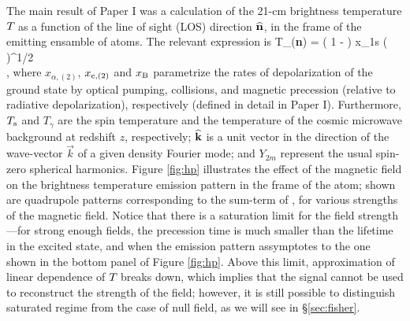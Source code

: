 The main result of Paper I was a calculation of the 21-cm brightness temperature $T_{\rm }$ as a function of the line of sight (LOS) direction ${\bf{\widehat n}}$, in the frame of the emitting ensamble of atoms. The relevant expression is
\beq
\bga
   T_{\rm }({\bf{\widehat n}}) = \left( 1 -  \right) x_{1{\rm s}} \left(  \right)^{1/2} \\
  \times {} \mbox{,} 
\ega
\label{eq:tbsoln}
\eeq
where $x_{\alpha, (2)}$, $x_{{\rm c}, (2)}$ and $x_{\rm B}$ parametrize the rates of depolarization of the ground state by optical pumping, collisions, and magnetic precession (relative to radiative depolarization), respectively (defined in detail in Paper I). Furthermore,  $T_{\rm s}$ and $T_\gamma$ are the spin temperature and the temperature of the cosmic microwave background at redshift $z$, respectively; $\bf{\widehat k}$ is a unit vector in the direction of the wave-vector $\vec k$ of a given density Fourier mode; and $Y_{2 m}$ represent the usual spin-zero spherical harmonics. Figure \ref{fig:hp} illustrates the effect of the magnetic field on the brightness temperature emission pattern in the frame of the atom; shown are quadrupole patterns corresponding to the sum-term of \eq{\ref{eq:tbsoln}}, for various strengths of the magnetic field. Notice that there is a saturation limit for the field strength---for strong enough fields, the precession time is much smaller than the lifetime in the excited state, and when the emission pattern assymptotes to the one shown in the bottom panel of Figure \ref{fig:hp}. Above this limit, approximation of linear dependence of $T_{\rm }$ breaks down, which implies that the signal cannot be used to reconstruct the strength of the field; however, it is still possible to distinguish saturated regime from the case of null field, as we will see in \S\ref{sec:fisher}.

